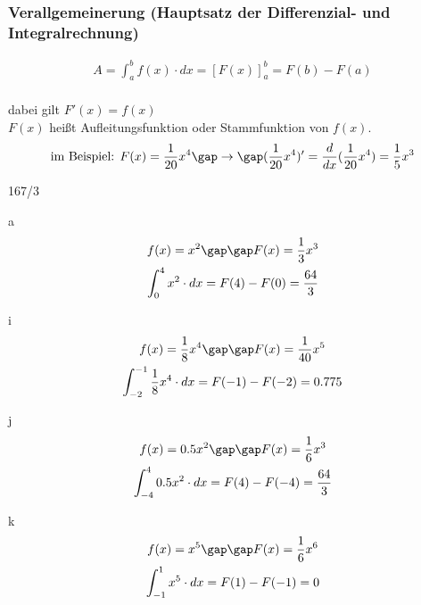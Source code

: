 \subsubsection{Verallgemeinerung (Hauptsatz der Differenzial- und Integralrechnung)}
\begin{gather*}
  A = \int_a^b f(x) \cdot dx = \left[F(x)\right]_a^b = F(b) - F(a)
\end{gather*} \\
dabei gilt $F'(x) = f(x)$ \\
$F(x)$ heißt Aufleitungsfunktion oder Stammfunktion von $f(x)$.
\begin{gather*}
  \text{im Beispiel: } F(x) = \frac{1}{20}x^4 \gap\rightarrow\gap (\frac{1}{20}x^4)' = \frac{d}{dx}(\frac{1}{20}x^4) = \frac{1}{5}x^3
\end{gather*}
\begin{exercise}{167/3}
  \item [a]
  \begin{gather*}
    f(x) = x^2 \gap\gap F(x) = \frac{1}{3}x^3 \\
    \int_0^4 x^2 \cdot dx = F(4) - F(0) = \frac{64}{3}
  \end{gather*}
  \item [i]
  \begin{gather*}
    f(x) = \frac{1}{8}x^4 \gap\gap F(x) = \frac{1}{40}x^5 \\
    \int_{-2}^{-1} \frac{1}{8}x^4 \cdot dx = F(-1) - F(-2) = 0.775
  \end{gather*}
  \item [j]
  \begin{gather*}
    f(x) = 0.5x^2 \gap\gap F(x) = \frac{1}{6}x^3 \\
    \int_{-4}^4 0.5x^2 \cdot dx = F(4) - F(-4) = \frac{64}{3}
  \end{gather*}
  \item [k]
  \begin{gather*}
    f(x) = x^5 \gap\gap F(x) = \frac{1}{6}x^6 \\
    \int_{-1}^1 x^5 \cdot dx = F(1) - F(-1) = 0
  \end{gather*}
\end{exercise}
